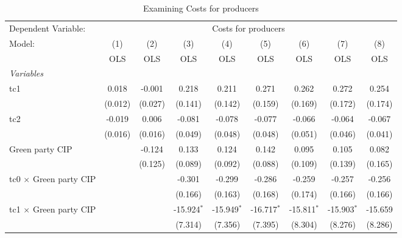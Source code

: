 
\begin{table}[htbp]
   \caption{Examining Costs for producers}
   \centering
   \begin{tabular}{lcccccccc}
      \toprule
      Dependent Variable: & \multicolumn{8}{c}{Costs for producers}\\
      Model:                                  & (1)     & (2)     & (3)           & (4)           & (5)           & (6)           & (7)           & (8)\\  
                                              &  OLS    & OLS     & OLS           & OLS           & OLS           & OLS           & OLS           & OLS\\  
      \midrule
      \emph{Variables}\\
      tc1                                     & 0.018   & -0.001  & 0.218         & 0.211         & 0.271         & 0.262         & 0.272         & 0.254\\   
                                              & (0.012) & (0.027) & (0.141)       & (0.142)       & (0.159)       & (0.169)       & (0.172)       & (0.174)\\   
      tc2                                     & -0.019  & 0.006   & -0.081        & -0.078        & -0.077        & -0.066        & -0.064        & -0.067\\   
                                              & (0.016) & (0.016) & (0.049)       & (0.048)       & (0.048)       & (0.051)       & (0.046)       & (0.041)\\   
      Green party CIP                         &         & -0.124  & 0.133         & 0.124         & 0.142         & 0.095         & 0.105         & 0.082\\   
                                              &         & (0.125) & (0.089)       & (0.092)       & (0.088)       & (0.109)       & (0.139)       & (0.165)\\   
      tc0 $\times$ Green party CIP            &         &         & -0.301        & -0.299        & -0.286        & -0.259        & -0.257        & -0.256\\   
                                              &         &         & (0.166)       & (0.163)       & (0.168)       & (0.174)       & (0.166)       & (0.166)\\   
      tc1 $\times$ Green party CIP            &         &         & -15.924$^{*}$ & -15.949$^{*}$ & -16.717$^{*}$ & -15.811$^{*}$ & -15.903$^{*}$ & -15.659\\   
                                              &         &         & (7.314)       & (7.356)       & (7.395)       & (8.304)       & (8.276)       & (8.286)\\   

\end{tabular}
\end{table}
